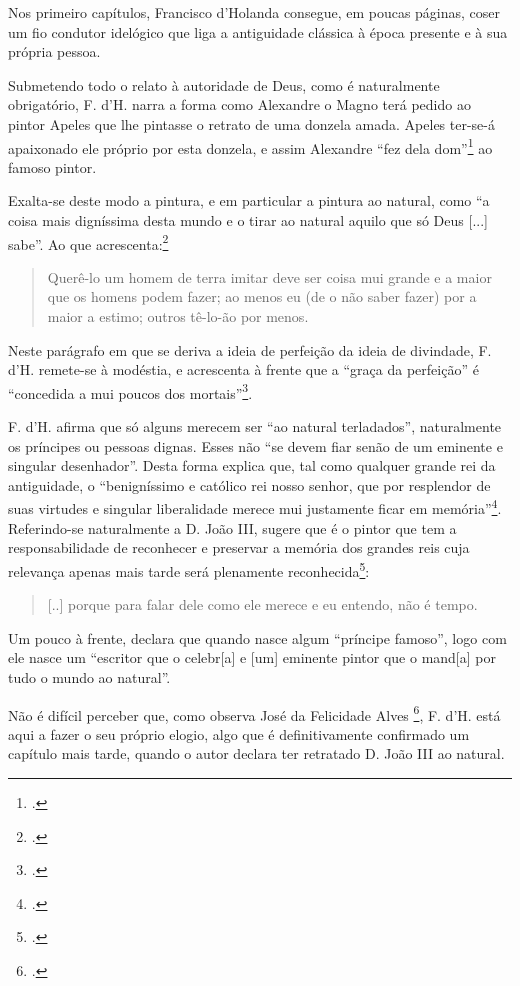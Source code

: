 \documentclass{article}
\begin{document}
Nos primeiro capítulos, Francisco d'Holanda consegue, em poucas
páginas, coser um fio condutor idelógico que liga a antiguidade
clássica à época presente e à sua própria pessoa.

Submetendo todo o relato à autoridade de Deus, como é naturalmente
obrigatório, F. d'H. narra a forma como Alexandre o Magno terá pedido
ao pintor Apeles que lhe pintasse o retrato de uma donzela
amada. Apeles ter-se-á apaixonado ele próprio por esta donzela, e
assim Alexandre ``fez dela dom''\footcite[p.13]{holanda} ao famoso pintor.

Exalta-se deste modo a pintura, e em particular a pintura ao natural,
como ``a coisa mais digníssima desta mundo e o tirar ao natural aquilo
que só Deus [...] sabe''. Ao que acrescenta:\footcite[p.13]{holanda}

\begin{quote}
   Querê-lo um homem de terra imitar deve ser coisa mui grande e a
   maior que os homens podem fazer; ao menos eu (de o não saber fazer)
   por a maior a estimo; outros tê-lo-ão por menos.
\end{quote}

Neste parágrafo em que se deriva a ideia de perfeição da ideia de
divindade, F. d'H. remete-se à modéstia, e acrescenta à frente que a
``graça da perfeição'' é ``concedida a mui poucos dos
mortais''\footcite[p.14]{holanda}.

F. d'H. afirma que só alguns merecem ser ``ao natural terladados'',
naturalmente os príncipes ou pessoas dignas. Esses não ``se devem fiar
senão de um eminente e singular desenhador''. Desta forma explica que,
tal como qualquer grande rei da antiguidade, o ``benigníssimo e
católico rei nosso senhor, que por resplendor de suas virtudes e
singular liberalidade merece mui justamente ficar em
memória''\footcite[p.15]{holanda}. Referindo-se naturalmente a D. João
III, sugere que é o pintor que tem a responsabilidade de reconhecer e
preservar a memória dos grandes reis cuja relevança apenas mais tarde
será plenamente reconhecida\footcite[p.15]{holanda}:

\begin{quote}
  [..] porque para falar dele como ele merece e eu entendo, não é tempo.
\end{quote}

Um pouco à frente, declara que quando nasce algum ``príncipe famoso'', logo com
ele nasce um ``escritor que o celebr[a] e [um] eminente pintor que o
mand[a] por tudo o mundo ao natural''.

Não é difícil perceber que, como observa José da Felicidade Alves
\footcite[p.47]{holanda}, F. d'H. está aqui a fazer o seu próprio elogio,
algo que é definitivamente confirmado um capítulo mais tarde, quando o
autor declara ter retratado D. João III ao natural.
\end{document}
